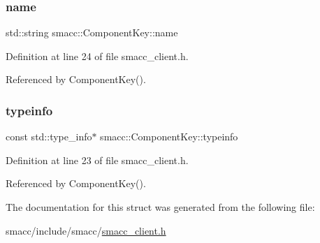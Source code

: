 \subsubsection{\texorpdfstring{name}{name}}
{\footnotesize\ttfamily std\+::string smacc\+::\+Component\+Key\+::name}



Definition at line 24 of file smacc\+\_\+client.\+h.



Referenced by Component\+Key().

\mbox{\label{structsmacc_1_1ComponentKey_a148bab7ba01039d4bcabfd93529b333a}} 
\subsubsection{\texorpdfstring{typeinfo}{typeinfo}}
{\footnotesize\ttfamily const std\+::type\+\_\+info$\ast$ smacc\+::\+Component\+Key\+::typeinfo}



Definition at line 23 of file smacc\+\_\+client.\+h.



Referenced by Component\+Key().



The documentation for this struct was generated from the following file\+:\begin{DoxyCompactItemize}
\item 
smacc/include/smacc/\hyperlink{smacc__client_8h}{smacc\+\_\+client.\+h}\end{DoxyCompactItemize}
